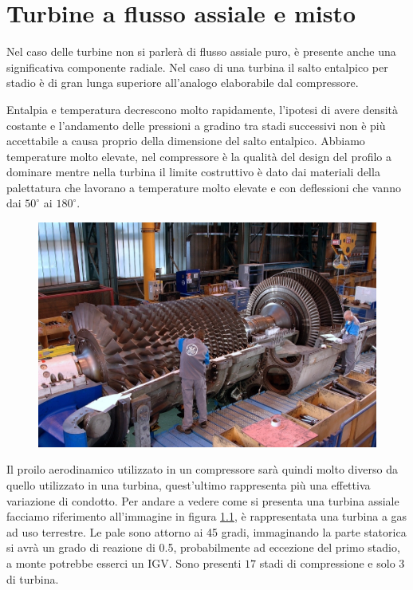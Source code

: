 \chapter{Turbine a flusso assiale e misto}
Nel caso delle turbine non si parlerà di flusso assiale puro, è presente anche una significativa componente radiale. Nel caso di una turbina il salto entalpico per stadio è di gran lunga superiore all'analogo elaborabile dal compressore. 

Entalpia e temperatura decrescono molto rapidamente, l'ipotesi di avere densità costante e l'andamento delle pressioni a gradino tra stadi successivi non è più accettabile a causa proprio della dimensione del salto entalpico. Abbiamo temperature molto elevate, nel compressore è la qualità del design del profilo a dominare mentre nella turbina il limite costruttivo è dato dai materiali della palettatura che lavorano a temperature molto elevate e con deflessioni che vanno dai $50^{\circ}$ ai $180^{\circ}$. 
\begin{figure}[h!]
\centering
  \includegraphics[width=.9\textwidth]{fig/TurboGas.png}
\caption{}
\label{fig:TurboGas}
\end{figure}
Il proilo aerodinamico utilizzato in un compressore sarà quindi molto diverso da quello utilizzato in una turbina, quest'ultimo rappresenta più una effettiva variazione di condotto. 
Per andare a vedere come si presenta una turbina assiale facciamo riferimento all'immagine in figura \ref{fig:TurboGas}, è rappresentata una turbina a gas ad uso terrestre. Le pale sono attorno ai 45 gradi, immaginando la parte statorica si avrà un grado di reazione di 0.5, probabilmente ad eccezione del primo stadio, a monte potrebbe esserci un IGV. Sono presenti $17$ stadi di compressione e solo $3$ di turbina. 

